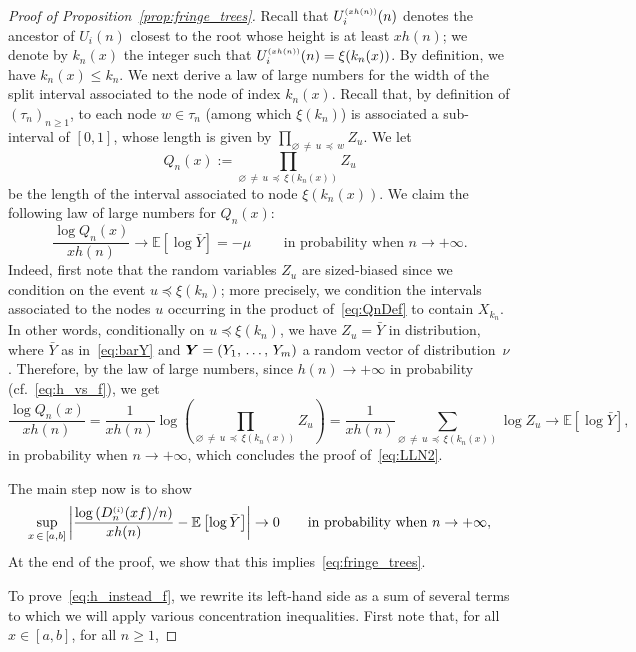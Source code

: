 \documentclass[10pt]{amsart}
\theoremstyle{definition}\newtheorem{defi}[theo]{Definition}\newtheorem{rema}[theo]{Remark}\newtheorem{exam}[theo]{Example}\newtheorem{exem}[theo]{Example}\newtheorem{nota}[theo]{Notation}
\newcommand{\bs}{\ensuremath{\boldsymbol}}
\newcommand{\sss}{\ensuremath{\scriptscriptstyle}}
\newcommand{\bbE}{\mathbb{E}}
\begin{document}
\begin{proof}[Proof of Proposition~\ref{prop:fringe_trees}]
Recall that $U_i^{\sss (xh(n))}(n)$ denotes the ancestor of $U_i(n)$ closest to the root whose height is at least $xh(n)$; we denote by $k_n(x)$ the integer such that $U_i^{\sss (xh(n))}(n) = \xi(k_n(x))$. By definition, we have $k_n(x)\leq k_n$. We next derive a law of large numbers for the width of the split interval associated to the node of index $k_n(x)$. Recall that, by definition of $(\tau_n)_{n\geq 1}$, to each node $w \in \tau_n$ (among which $\xi(k_n)$) is associated a sub-interval of $[0,1]$, whose length is given by $\prod_{\varnothing\,\neq\,u\,\preccurlyeq\,w} Z_u.$ We let
\begin{equation}\label{eq:QnDef}
Q_n(x) := \prod_{\varnothing\,\neq\,u\,\preccurlyeq\,\xi(k_n(x))} Z_u
\end{equation}
be the length of the interval associated to node $\xi(k_n(x))$. We claim the following law of large numbers for $Q_n(x)$:
\begin{equation}\label{eq:LLN2}
\frac{\log Q_n(x)}{xh(n)}
\to \bbE[\log \bar Y] = -\mu \qquad \text{ in probability when }n\to+\infty.
\end{equation}
Indeed, first note that the random variables $Z_u$ are sized-biased since we condition on the event $u\preccurlyeq \xi(k_n)$; more precisely, we condition the intervals associated to the nodes $u$ occurring in the product of~\eqref{eq:QnDef} to contain $X_{k_n}$. In other words, conditionally on $u\preccurlyeq \xi(k_n)$, we have $Z_u = \bar Y$ in distribution, where $\bar Y$ as in~\eqref{eq:barY} and $\bs Y = (Y_1, \,\ldots,\, Y_m)$ a random vector of distribution~$\nu$. Therefore, by the law of large numbers, since $h(n)\to+\infty$ in probability (cf.~\eqref{eq:h_vs_f}), we get
\[
\frac{\log Q_n(x)}{xh(n)} = \frac1{xh(n)}\log \left(\prod_{\varnothing\,\neq\,u\,\preccurlyeq\,\xi(k_n(x))} Z_u\right) = \frac1{xh(n)}\sum_{\varnothing\,\neq\,u\,\preccurlyeq \,\xi(k_n(x))} \log Z_u
\to \bbE\left[\log \bar Y\right],
\]
in probability when $n\to+\infty$, which concludes the proof of~\eqref{eq:LLN2}.


The main step now is to show
\begin{equation}\label{eq:h_instead_f}
\sup_{x\,\in\,[a,b]} \left|\frac{\log \left(D_n^{\sss (i)}(xf)/n\right)}{xh(n)}- \bbE\left[\log \bar Y\right]\right|\to 0
\qquad\text{in probability when }n\to+\infty,
\end{equation}
At the end of the proof, we show that this implies~\eqref{eq:fringe_trees}.

To prove~\eqref{eq:h_instead_f}, we rewrite its left-hand side as a sum of several terms to which we will apply various concentration inequalities. First note that, for all $x\in [a,b]$, for all $n\geq 1$,


\end{proof}
\end{document}
